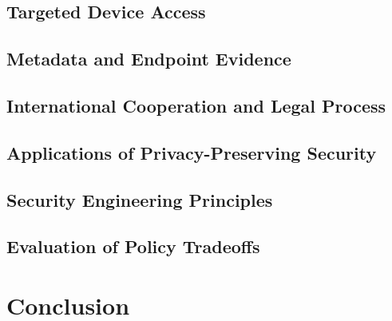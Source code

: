 \documentclass{easychair}
\begin{document}
\subsection{Targeted Device Access}


\subsection{Metadata and Endpoint Evidence}


\subsection{International Cooperation and Legal Process}


\subsection{Applications of Privacy-Preserving Security}


\subsection{Security Engineering Principles}


\subsection{Evaluation of Policy Tradeoffs}


\section{Conclusion}




\end{document}

